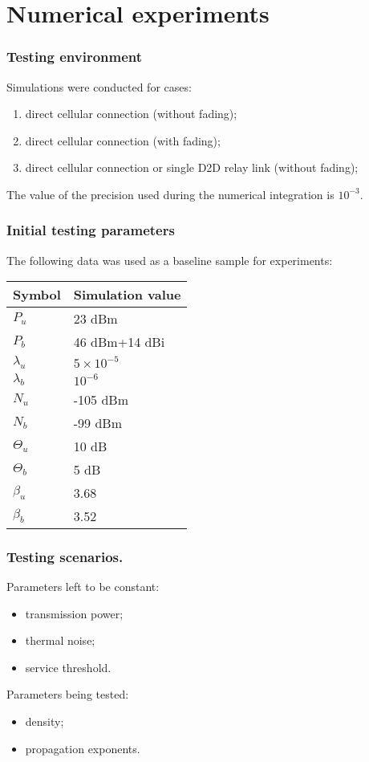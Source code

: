 \section{Numerical experiments}
\begin{frame}
\frametitle{Testing environment}
Simulations were conducted for cases:
\begin{enumerate}
    \item direct cellular connection (without fading);
    \item direct cellular connection (with fading);
	\item direct cellular connection or single D2D relay link (without fading);
\end{enumerate}
The value of the precision used during the numerical integration is $10^{-3}$.
\end{frame}

\begin{frame}
  \frametitle{Initial testing parameters}
The following data was used as a baseline sample for experiments:

\begin{center}
    \begin{tabular}{ | l | p{3cm} | }
	  \hline
	  Symbol & Simulation value \\
	  \hline
	  ${P_u}$ & 23 dBm\\
	  ${P_b}$ & 46 dBm+14 dBi\\
	  ${\lambda_u}$ & ${5\times 10^{-5}}$\\
	  ${\lambda_b}$ & $10^{-6}$\\
	  ${N_u}$ & -105 dBm\\
	  ${N_b}$ & -99 dBm\\
	  ${\Theta_u}$ & 10 dB\\
	  ${\Theta _b}$ & 5 dB\\
	  ${\beta_u}$ & 3.68\\
	  ${\beta_b}$ & 3.52\\
	  \hline
	\end{tabular}
\end{center}
\end{frame}

\begin{frame}
\frametitle{Testing scenarios.}
Parameters left to be constant:
\begin{itemize}
  \item transmission power;
  \item thermal noise;
  \item service threshold.
\end{itemize}
Parameters being tested:
\begin{itemize}
  \item density;
  \item propagation exponents.
\end{itemize}
\end{frame}

